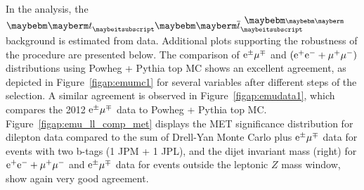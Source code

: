 
In the analysis, the $\Pqt \Paqt$ background is estimated from data. Additional
plots supporting the robustness of the procedure are presented below.
The comparison of $\mathrm{e}^\pm\mu^\mp$ and $(\mathrm{e^+e^-}+\mu^+\mu^-)$ distributions using Powheg + Pythia top MC shows
an excellent agreement, as depicted in Figure~\ref{figap:emumc1}
for several variables after different steps of the selection. A similar agreement
is observed in Figure~\ref{figap:emudata1}, which compares the 2012 $\mathrm{e}^\pm\mu^\mp$ data to Powheg + Pythia top MC.
Figure~\ref{figap:emu_ll_comp_met} displays the MET significance distribution
for dilepton data compared to the sum of Drell-Yan Monte Carlo
plus $\mathrm{e}^\pm\mu^\mp$ data for events with two b-tags (1 JPM + 1 JPL), and the dijet
invariant mass (right) for $\mathrm{e^+e^-} + \mu^+\mu^-$ and $\mathrm{e}^\pm\mu^\mp$ data for events outside the leptonic $Z$ mass window,
show again very good agreement.

